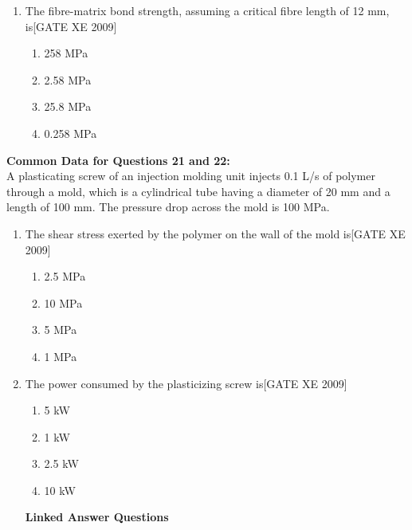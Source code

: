 \documentclass[journal,12pt,onecolumn]{IEEEtran}
\theoremstyle{remark}
\begin{document}
\begin{enumerate}
\begin{enumerate}
\begin{enumerate}[label=\textbf{Q.\arabic*.},  wide=0pt, leftmargin=*]
\item The fibre-matrix bond strength, assuming a critical fibre length of 12 mm, is\hfill[GATE XE 2009]
\begin{multicols}{2}
\begin{enumerate}
\item 258 MPa
\item 2.58 MPa
\item 25.8 MPa
\item 0.258 MPa
\end{enumerate}
\end{multicols}

\end{enumerate}

\vspace{1em}
\textbf{Common Data for Questions 21 and 22:}\\
A plasticating screw of an injection molding unit injects 0.1 L/s of polymer through a mold, which is a cylindrical tube having a diameter of 20 mm and a length of 100 mm. The pressure drop across the mold is 100 MPa.

\begin{enumerate}[label=\textbf{Q.\arabic*.}, resume, wide=0pt, leftmargin=*]

\item The shear stress exerted by the polymer on the wall of the mold is\hfill[GATE XE 2009]
\begin{multicols}{2}
\begin{enumerate}
\item 2.5 MPa
\item 10 MPa
\item 5 MPa
\item 1 MPa
\end{enumerate}
\end{multicols}

\item The power consumed by the plasticizing screw is\hfill[GATE XE 2009]
\begin{multicols}{2}
\begin{enumerate}
\item 5 kW
\item 1 kW
\item 2.5 kW
\item 10 kW
\end{enumerate}
\end{multicols}



\vspace{1em}
\textbf{Linked Answer Questions}


\end{enumerate}
\end{enumerate}
\end{enumerate}
\end{document}
